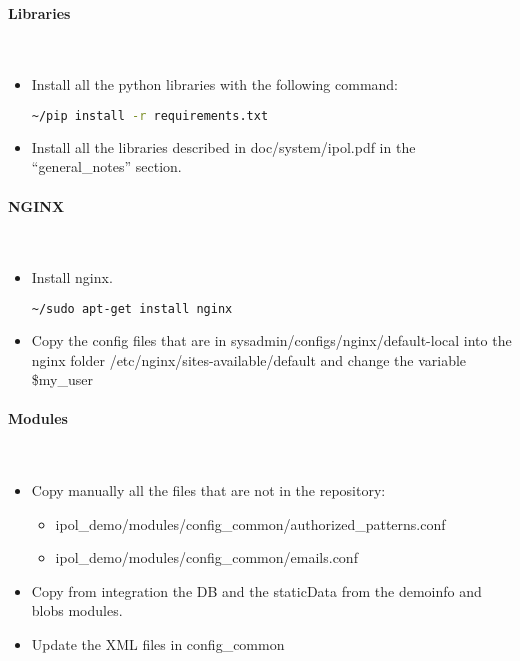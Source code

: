 \paragraph{Libraries} \hspace{0pt} \\
\begin{itemize}
 \item Install all the python libraries with the following command:
  \begin{lstlisting}[language=Bash]
  ~/pip install -r requirements.txt
  \end{lstlisting}
 \item Install all the libraries described in doc/system/ipol.pdf in the ``general\_notes'' section.
\end{itemize}

\paragraph{NGINX} \hspace{0pt} \\
\begin{itemize}
 \item Install nginx.
  \begin{lstlisting}[language=Bash]
  ~/sudo apt-get install nginx
  \end{lstlisting}
 \item Copy the config files that are in sysadmin/configs/nginx/default-local into the nginx folder /etc/nginx/sites-available/default and change the variable \$my\_user
\end{itemize}

\paragraph{Modules} \hspace{0pt} \\
\begin{itemize}
 \item Copy manually all the files that are not in the repository:
 
  \begin{itemize}
   \item ipol\_demo/modules/config\_common/authorized\_patterns.conf
   \item ipol\_demo/modules/config\_common/emails.conf
  \end{itemize}

 \item Copy from integration the DB and the staticData from the demoinfo and blobs modules.
 \item Update the XML files in config\_common
\end{itemize}

